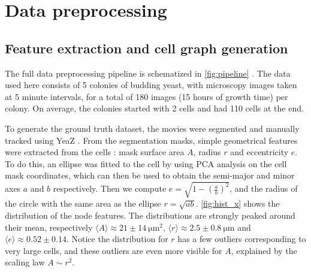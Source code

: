 \documentclass[10pt,conference,compsocconf,a4paper]{IEEEtran}
\newcommand{\nunit}[1]{\ \si{#1}}  %
\newcommand{\avg}[1]{\langle{#1}\rangle}
\newcommand*{\shortautoref}[1]{%
	\begingroup
	\def\equationautorefname{\textsc{Eq.}}%
	\def\tableautorefname{\textsc{Tab.}}%
	\def\figureautorefname{\textsc{Fig.}}%
	\autoref{#1}%
	\endgroup
}
\begin{document}

\section{Data preprocessing} \label{sec:data_preprocessing}

	\subsection{Feature extraction and cell graph generation} \label{sec:data_preprocessing:featext}

		The full data preprocessing pipeline is schematized in \shortautoref{fig:pipeline}. The data used here consists of 5 colonies of budding yeast, with microscopy images taken at 5 minute intervals, for a total of 180 images (15 hours of growth time) per colony. On average, the colonies started with 2 cells and had 110 cells at the end.


		To generate the ground truth dataset, the movies were segmented and manually tracked using YeaZ \cite{dietler_convolutional_2020}. From the segmentation masks, simple geometrical features were extracted from the cells : mask surface area $A$, radius $r$ and eccentricity $e$. To do this, an ellipse was fitted to the cell by using PCA analysis on the cell mask coordinates, which can then be used to obtain the semi-major and minor axes $a$ and $b$ respectively. Then we compute $e=\sqrt{1-(\frac{a}{b})^2}$, and the radius of the circle with the same area as the ellipse $r=\sqrt{ab}$. \shortautoref{fig:hist_x} shows the distribution of the node features. The distributions are strongly peaked around their mean, respectively $\avg{A} \approx 21 \pm 14 \nunit{\micro \meter \squared}$, $\avg{r} \approx 2.5 \pm 0.8 \nunit{\micro \meter}$ and $\avg{e} \approx 0.52 \pm 0.14$. Notice the distribution for $r$ has a few outliers corresponding to very large cells, and these outliers are even more visible for $A$, explained by the scaling law $A \sim r^2$.
\end{document}
